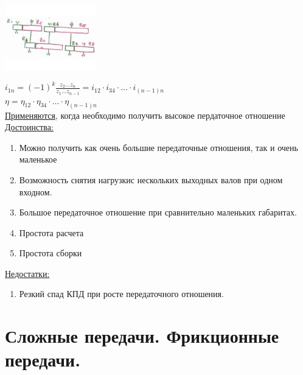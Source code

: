 \documentclass{article}
\begin{document}
\begin{multicols}{3}
\includegraphics[width = 0.3\textwidth]{17_2}

$i_{1n} = (-1)^k \frac{z_2 \dots z_n}{z_1 \dots z_{n-1}} = i_{12} \cdot i_{34} \cdot \dots \cdot i_{(n-1)n}$\\
$\eta = \eta_{12} \cdot \eta_{34} \cdot \dots \cdot \eta_{(n-1)n}$\\

\underline{Применяются}, когда необходимо получить высокое пердаточное отношение
\underline{Достоинства:}
\begin{enumerate}
	\item Можно получить как очень большие передаточные отношения, так и очень маленькое
	\item Возможность снятия нагрузкис нескольких выходных валов при одном входном.
	\item Большое передаточное отношение при сравнительно маленьких габаритах.
	\item Простота расчета
	\item Простота сборки
\end{enumerate}
\underline{Недостатки:} 
\begin{enumerate}
	\item Резкий спад КПД при росте передаточного отношения.
\end{enumerate}

\section {\tiny Сложные передачи. Фрикционные передачи.}


\end{multicols}
\end{document}
